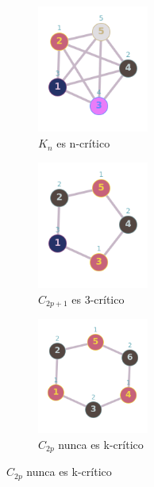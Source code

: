 \documentclass[a4paper,1pt]{report}
\begin{document}
\begin{figure}[H]
    \centering
    \begin{subfigure}[b]{0.30\textwidth}
        \centering
        \includegraphics[width=0.4\textwidth]{figures6/k5Col.png}
        \caption{$K_n$ es n-cr\'itico}
    \end{subfigure} 
    \begin{subfigure}[b]{0.30\textwidth}
        \centering
        \includegraphics[width=0.4\textwidth]{figures6/C5Col.png}
        \caption{$C_{2p +1}$ es 3-cr\'itico}
    \end{subfigure}
    \begin{subfigure}[b]{0.30\textwidth}
        \centering
        \includegraphics[width=0.4\textwidth]{figures6/C6Col.png}
        \caption{$C_{2p}$ nunca es k-cr\'itico}
    \end{subfigure}
\end{figure} 
\end{document}
